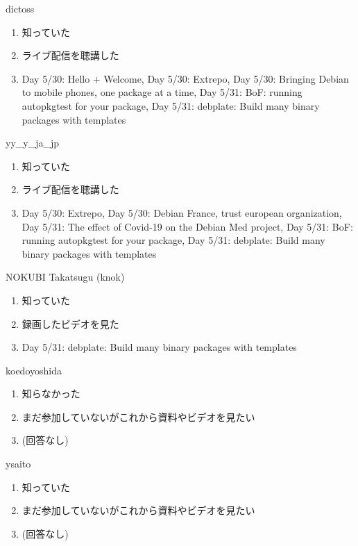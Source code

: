 \begin{prework}{ dictoss }
  \begin{enumerate}
  \item 知っていた
  \item ライブ配信を聴講した
  \item Day 5/30: Hello + Welcome, Day 5/30: Extrepo, Day 5/30: Bringing Debian to mobile phones, one package at a time, Day 5/31: BoF: running autopkgtest for your package, Day 5/31: debplate: Build many binary packages with templates
  \end{enumerate}
\end{prework}

\begin{prework}{ yy\_y\_ja\_jp }
  \begin{enumerate}
  \item 知っていた
  \item ライブ配信を聴講した
  \item Day 5/30: Extrepo, Day 5/30: Debian France, trust european organization, Day 5/31: The effect of Covid-19 on the Debian Med project, Day 5/31: BoF: running autopkgtest for your package, Day 5/31: debplate: Build many binary packages with templates
  \end{enumerate}
\end{prework}

\begin{prework}{ NOKUBI Takatsugu (knok) }
  \begin{enumerate}
  \item 知っていた
  \item 録画したビデオを見た
  \item Day 5/31: debplate: Build many binary packages with templates
  \end{enumerate}
\end{prework}

\begin{prework}{ koedoyoshida }
  \begin{enumerate}
  \item 知らなかった
  \item まだ参加していないがこれから資料やビデオを見たい
  \item (回答なし)
  \end{enumerate}
\end{prework}

\begin{prework}{ ysaito }
  \begin{enumerate}
  \item 知っていた
  \item まだ参加していないがこれから資料やビデオを見たい
  \item (回答なし)
  \end{enumerate}
\end{prework}

